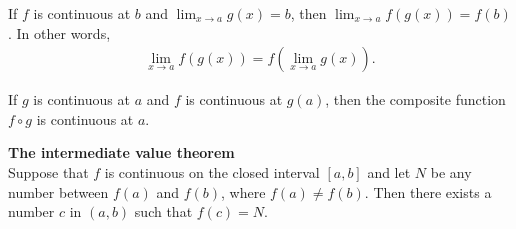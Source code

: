 \documentclass{article}
\begin{document}
\begin{theorem}
	If $f$ is continuous at $b$ and $\lim_{x\to a}g(x) = b$, then $\lim_{x\to a}f(g(x))=f(b)$. In other words,
	\begin{align*}
		\lim_{x\to a}f(g(x))=f\left(\lim_{x\to a}g(x)\right).
	\end{align*}
\end{theorem}
\begin{theorem}
	If $g$ is continuous at $a$ and $f$ is continuous at $g(a)$, then the composite function $f\circ g$ is continuous at $a$.
\end{theorem}
\begin{theorem}
	\textbf{The intermediate value theorem}\\
	Suppose that $f$ is continuous on the closed interval $[a,b]$ and let $N$ be any number between $f(a)$ and $f(b)$, where $f(a)\not=f(b)$. Then there exists a number $c$ in $(a,b)$ such that $f(c)=N$.
\end{theorem}
\end{document}
